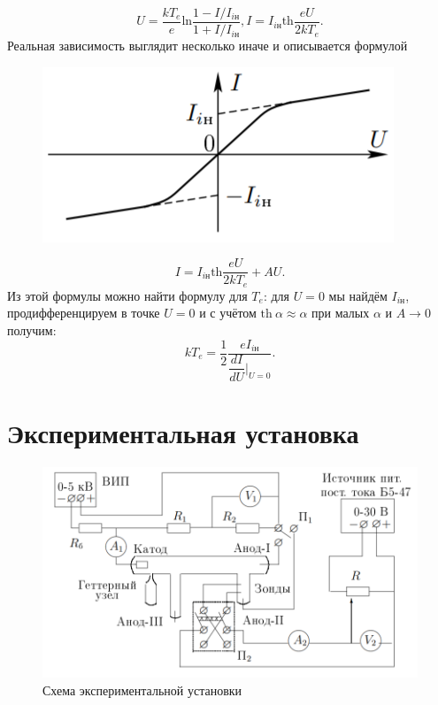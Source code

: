 \documentclass[a4paper, 12pt]{article}
\begin{document}
\begin{equation}
U = \dfrac{kT_e}{e}\text{ln}\dfrac{1 - I/I_{i\text{н}}}{1 + I/I_{i\text{н}}}, 
I = I_{i\text{н}} \text{th}\dfrac{eU}{2kT_e}.
\end{equation}
Реальная зависимость выглядит несколько иначе и описывается формулой 
\begin{figure}
\includegraphics[scale=0.8]{4.png}
\vspace{+30pt}
\end{figure}
\begin{equation}
I = I_{i\text{н}} \text{th}\dfrac{eU}{2kT_e} + AU.
\end{equation}
Из этой формулы можно найти формулу для $T_e$: для $U=0$ мы найдём $I_{i\text{н}}$, продифференцируем в точке $U=0$ и с учётом $\text{th}~\alpha \approx \alpha$ при малых $\alpha$ и $A\rightarrow 0$ получим:
\begin{equation}
kT_e = \dfrac{1}{2}\dfrac{eI_{i\text{н}}}{\dfrac{dI}{dU}|_{U=0}}.
\end{equation}

\newpage
\section{Экспериментальная установка}

\begin{figure}[h]
\begin{center}
\includegraphics[width=1\textwidth]{Схема_установки}
\end{center}
\caption{Схема экспериментальной установки} \label{Установка}
\end{figure}
\end{document}

